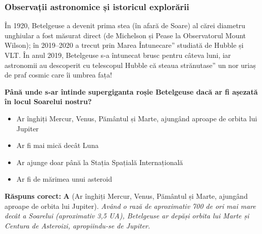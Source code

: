 \subsubsection*{Observații astronomice și istoricul explorării}
În 1920, Betelgeuse a devenit prima stea (în afară de Soare) al cărei diametru unghiular a fost măsurat direct (de Michelson și Pease la Observatorul Mount Wilson); în 2019--2020 a trecut prin \quotedblbase{}Marea Întunecare\textquotedblright{} studiată de Hubble și VLT. În anul 2019, Betelgeuse s-a întunecat brusc pentru câteva luni, iar astronomii au descoperit cu telescopul Hubble că steaua \quotedblbase{}strănutase\textquotedblright{} un nor uriaș de praf cosmic care îi umbrea fața!

\vspace{6pt}
\begin{tcolorbox}[orbitarquiz, title={\textbf{Întrebare de verificare \#61: Betelgeuse (Supergiganta Roșie)}}]
\textbf{Până unde s-ar întinde supergiganta roșie Betelgeuse dacă ar fi așezată în locul Soarelui nostru?}
\begin{itemize}[leftmargin=2.2em, itemsep=2pt, topsep=4pt]
  \item[$\square$ \textbf{A.}] Ar înghiți Mercur, Venus, Pământul și Marte, ajungând aproape de orbita lui Jupiter
  \item[$\square$ \textbf{B.}] Ar fi mai mică decât Luna
  \item[$\square$ \textbf{C.}] Ar ajunge doar până la Stația Spațială Internațională
  \item[$\square$ \textbf{D.}] Ar fi de mărimea unui asteroid
\end{itemize}
\vspace{2pt}
{\footnotesize\color{orbitarMuted}\textbf{Răspuns corect:} \textbf{A} (Ar înghiți Mercur, Venus, Pământul și Marte, ajungând aproape de orbita lui Jupiter). \emph{Având o rază de aproximativ 700 de ori mai mare decât a Soarelui (aproximativ 3,5 UA), Betelgeuse ar depăși orbita lui Marte și Centura de Asteroizi, apropiindu-se de Jupiter.}}
\end{tcolorbox}
\clearpage

